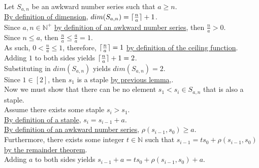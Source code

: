 \documentclass[a4paper,12pt]{article}
\DeclarePairedDelimiter{\ceil}{\lceil}{\rceil}
\begin{document}
\noindent Let $S_{a, n}$ be an awkward number series such that $a \geq n$.\\

\noindent \hyperlink{definition:dimension}{By definition of dimension}, $dim(S_{a,n}) = \ceil{\frac{n}{a}} + 1$.\\

\noindent Since $a, n \in \mathbb{N}^+$ \hyperlink{definition:awkward_number_series}{by definition of an awkward number series}, then $\frac{n}{a} > 0$.\\

\noindent Since $n \leq a$, then $\frac{n}{a} \leq \frac{a}{a} = 1$.\\

\noindent As such, $0 < \frac{n}{a} \leq 1$, therefore, $\ceil{\frac{n}{a}} = 1$ \hyperlink{definition:ceiling_function}{by definition of the ceiling function}.\\

\noindent Adding $1$ to both sides yields $\ceil{\frac{n}{a}} + 1 = 2$.\\

\noindent Substituting in $dim(S_{a, n})$ yields $dim(S_{a,n}) = 2$.\\

\noindent Since $1 \in [2]$, then $s_1$ is a staple \hyperlink{lemma:initial_staples}{by previous lemma},.\\

\noindent Now we must show that there can be no element $s_1 < s_i \in S_{a, n}$ that is also a staple.\\

\noindent Assume there exists some staple $s_i > s_1$.\\

\noindent \hyperlink{definition:staple}{By definition of a staple}, $s_i = s_{i - 1} + a$.\\

\noindent \hyperlink{definition:awkward_number_series}{By definition of an awkward number series}, $\rho(s_{i - 1}, s_0) \geq a$.\\

\noindent Furthermore, there exists some integer $t \in \mathbb{N}$ such that $s_{i - 1} = ts_0 + \rho(s_{i - 1}, s_0)$ \hyperlink{theorem:remainder_theorem}{by the remainder theorem}.\\

\noindent Adding $a$ to both sides yields $s_{i - 1} + a = ts_0 + \rho(s_{i - 1}, s_0) + a$.\\
\end{document}
